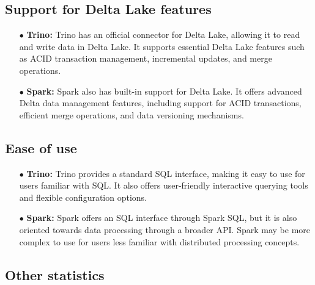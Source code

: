 \subsection{Support for Delta Lake features}
\begin{enumerate}
\item[$\bullet$] \textbf{Trino:} Trino has an official connector for Delta Lake, allowing it to read and write data in Delta Lake. It supports essential Delta Lake features such as ACID transaction management, incremental updates, and merge operations.
\item[$\bullet$] \textbf{Spark:} Spark also has built-in support for Delta Lake. It offers advanced Delta data management features, including support for ACID transactions, efficient merge operations, and data versioning mechanisms.
\end{enumerate}

\subsection{Ease of use}
\begin{enumerate}
\item[$\bullet$] \textbf{Trino:} Trino provides a standard SQL interface, making it easy to use for users familiar with SQL. It also offers user-friendly interactive querying tools and flexible configuration options.
\item[$\bullet$] \textbf{Spark:} Spark offers an SQL interface through Spark SQL, but it is also oriented towards data processing through a broader API. Spark may be more complex to use for users less familiar with distributed processing concepts.
\end{enumerate}

\subsection{Other statistics}

